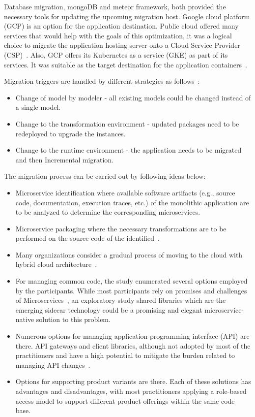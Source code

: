 \par Database migration, mongoDB and meteor framework, both provided the necessary tools for updating the upcoming migration host. Google cloud platform (GCP) is an option for the application destination. Public cloud offered many services that would help with the goals of this optimization, it was a logical choice to migrate the application hosting server onto a Cloud Service Provider (CSP)~\cite{Tuuli2020}. Also, GCP offers its Kubernetes as a service (GKE) as part of its services. It was suitable as the target destination for the application containers~\cite{haugeland2020}. 

Migration triggers are handled by different strategies as follows~\cite{overeem2018}:
\begin{itemize}
  \item Change of model by modeler - all existing models could be changed instead of a single model.
  \item Change to the transformation environment - updated packages need to be redeployed to upgrade the instances.
  \item Change to the runtime environment - the application needs to be migrated and then Incremental migration. 
\end{itemize}

\par The migration process can be carried out by following ideas below:
\begin{itemize}
  \item Microservice identification where available software artifacts (e.g., source code, documentation, execution traces, etc.) of the monolithic application are to be analyzed to determine the corresponding microservices.
  \item Microservice packaging where the necessary transformations are to be performed on the source code of the identified~\cite{selmadji2020}.
  \item Many organizations consider a gradual process of moving to the cloud with hybrid cloud architecture~\cite{Mikail2020}.
  \item For managing common code, the study enumerated several options employed by the participants. While most participants rely on promises and challenges of Microservices~\cite{wang2020}, an exploratory study shared libraries which are the emerging sidecar technology could be a promising and elegant microservice-native solution to this problem. 
  \item Numerous options for managing application programming interface (API) are there. API gateways and client libraries, although not adopted by most of the practitioners and have a high potential to mitigate the burden related to managing API changes~\cite{wang2020}. 
  \item Options for supporting product variants are there. Each of these solutions has advantages and disadvantages, with most practitioners applying a role-based access model to support different product offerings within the same code base. 
\end{itemize}


